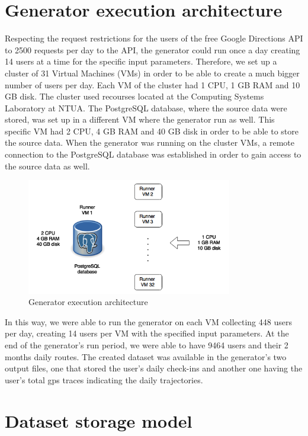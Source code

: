 \section{Generator execution architecture}

Respecting the request restrictions for the users of the free Google Directions API to 2500 requests per day to the API, the generator could run 
once a day creating 14 users at a time for the specific input parameters. Therefore, we set up a cluster of 31 Virtual Machines (VMs) in order to be able to create a much 
bigger number of users per day. Each VM of the cluster had 1 CPU, 1 GB RAM and 10 GB disk. The cluster used recourses located at the Computing 
Systems Laboratory at NTUA. The PostgreSQL database, where the source data were stored, was set up in a different VM where the 
generator run as well. This specific VM had 2 CPU, 4 GB RAM and 40 GB disk in order to be able to store the source data. When the generator was running 
on the cluster VMs, a remote connection to the PostgreSQL database was established in order to gain access to the source data as well. 

\begin{figure}[H]
  \centering
  \includegraphics[width=0.8\textwidth]{figures/gen_arch.png}
  \caption{Generator execution architecture}
\end{figure}

In this way, we were able to run the generator on each VM collecting 448 users per day, creating 14 users per VM with the specified input parameters. 
At the end of the generator's run period, we were able to have 9464 users and their 2 months daily routes. 
The created dataset was available in the generator's two output files, one that stored the user's daily check-ins and another one having the user's total 
gps traces indicating the daily trajectories.

\section{Dataset storage model}

